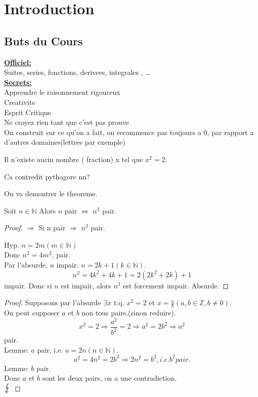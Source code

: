 \documentclass[../main.tex]{subfiles}
\begin{document}

\chapter{Introduction}
\section{Buts du Cours}
\textbf{\underline{Officiel:}}\\
Suites, series, fonctions, derivees, integrales , \ldots\\

\textbf{ \underline{Secrets:}}\\
Apprendre le raisonnement rigoureux\\
Creativite\\
Esprit Critique\\
Ne croyez rien tant que c'est pas prouve\\

On construit sur ce qu'on a fait, on recommence pas toujours a $0$, par rapport a d'autres domaines(lettres par exemple)

\begin{thm}[env. -400]\label{thm:env_400}
	Il n'existe aucin nombre ( fraction) x tel que $x^{2} = 2$.
\end{thm}


Ca contredit pythagore nn?

On va demontrer le theoreme.\\
\begin{lemma}[Lemme]\label{lemma:lemme}
	Soit $n \in \mathbb{N}$ 
	Alors $n$ pair $\iff$  $n^{2}$ pair.
\end{lemma}
\begin{proof}
$\Rightarrow$ Si n pair $\Rightarrow$ $n^{2}$ pair.

Hyp. $n = 2m ( m \in \mathbb{N})$ \\
Donc $n^{2} = 4m^{2}$, pair. \\

Par l'absurde, $n$ impair. $n=2k + 1 ( k \in \mathbb{N})$.\\
\[ 
	n^{2} = 4k^{2} + 4k + 1 = 2 ( 2k^{2} + 2k) + 1
\]
impair.
Donc si $n$ est impair, alors $n^{2}$ est forcement impair.
Absurde. 
\end{proof}
\begin{proof}
	Supposons par l'absurde $\exists x$ t.q. $x^{2} = 2$ et $x= \frac{a}{b} ( a,b \in \mathbb{Z}, b \neq 0)$.\\
	On peut supposer $a$ et $b$ non tous pairs.(sinon reduire).
	\[ 
	x^{2} = 2 \Rightarrow \frac{a^{2}}{b^{2}} = 2 \Rightarrow a^{2} = 2b^{2} \Rightarrow a^{2}
	\] 
	pair.\\
	Lemme: $a$ pair, i.e. $a=2n ( n \in \mathbb{N})$.
	\[ 
	a^{2}=4n^{2} = 2b^{2} \Rightarrow  2 n^{2} = b^{2}, i.e. b^{2} pair.
	\]
	Lemme: $b$ pair.\\
	Donc $a$ et $b$ sont les deux pairs, on a une contradiction.\\
	$\contra$
\end{proof}
\end{document}
